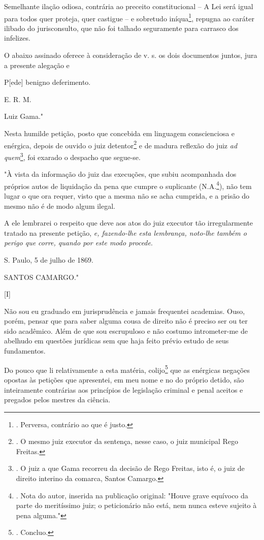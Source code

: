 Semelhante ilação odiosa, contrária ao preceito constitucional -- A Lei
será igual para todos quer proteja, quer castigue -- e sobretudo
iníqua\footnote{. Perversa, contrário ao que é justo.}, repugna ao
caráter ilibado do jurisconsulto, que não foi talhado seguramente para
carrasco dos infelizes.

O abaixo assinado oferece à consideração de v. s. os dois documentos
juntos, jura a presente alegação e

P{[}ede{]} benigno deferimento.

E. R. M.

Luiz Gama."

Nesta humilde petição, posto que concebida em linguagem conscienciosa e
enérgica, depois de ouvido o juiz detentor\footnote{. O mesmo juiz
  executor da sentença, nesse caso, o juiz municipal Rego Freitas.} e de
madura reflexão do juiz \emph{ad quem}\footnote{. O juiz a que Gama
  recorreu da decisão de Rego Freitas, isto é, o juiz de direito
  interino da comarca, Santos Camargo.}, foi exarado o despacho que
segue-se.

"À vista da informação do juiz das execuções, que subiu acompanhada dos
próprios autos de liquidação da pena que cumpre o suplicante
(N.A.\footnote{. Nota do autor, inserida na publicação original: "Houve
  grave equívoco da parte do meritíssimo juiz; o peticionário não está,
  nem nunca esteve sujeito à pena alguma."}), não tem lugar o que ora
requer, visto que a mesma não se acha cumprida, e a prisão do mesmo não
é de modo algum ilegal.

A ele lembrarei o respeito que deve aos atos do juiz executor tão
irregularmente tratado na presente petição, \emph{e, fazendo-lhe esta
lembrança, noto-lhe também o perigo que corre, quando por este modo
procede}.

S. Paulo, 5 de julho de 1869.

SANTOS CAMARGO."

{[}I{]}

Não sou eu graduado em jurisprudência e jamais frequentei academias.
Ouso, porém, pensar que para saber alguma cousa de direito não é preciso
ser ou ter sido acadêmico. Além de que sou escrupuloso e não costumo
intrometer-me de abelhudo em questões jurídicas sem que haja feito
prévio estudo de seus fundamentos.

Do pouco que li relativamente a esta matéria, colijo\footnote{. Concluo.}
que as enérgicas negações opostas às petições que apresentei, em meu
nome e no do próprio detido, são inteiramente contrárias aos princípios
de legislação criminal e penal aceitos e pregados pelos mestres da
ciência.

